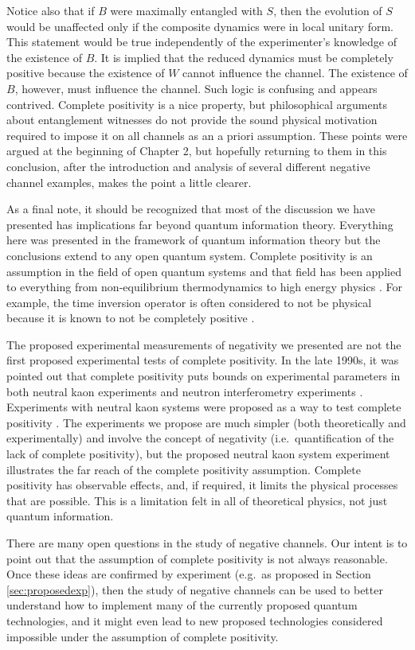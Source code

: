 Notice also that if $B$ were maximally entangled with $S$, then the evolution of $S$ would be unaffected only if the composite dynamics were in local unitary form.  This statement would be true independently of the experimenter's knowledge of the existence of $B$.  It is implied that the reduced dynamics must be completely positive because the existence of $W$ cannot influence the channel.  The existence of $B$, however, must influence the channel.  Such logic is confusing and appears contrived.  Complete positivity is a nice property, but philosophical arguments about entanglement witnesses do not provide the sound physical motivation required to impose it on all channels as an a priori assumption.  These points were argued at the beginning of Chapter 2, but hopefully returning to them in this conclusion, after the introduction and analysis of several different negative channel examples, makes the point a little clearer. 

As a final note, it should be recognized that most of the discussion we have presented has implications far beyond quantum information theory.  Everything here was presented in the framework of quantum information theory but the conclusions extend to any open quantum system.  Complete positivity is an assumption in the field of open quantum systems and that field has been applied to everything from non-equilibrium thermodynamics to high energy physics \cite{Breuer2007}.  For example, the time inversion operator is often considered to not be physical because it is known to not be completely positive \cite{Busch1990}.    

The proposed experimental measurements of negativity we presented are not the first proposed experimental tests of complete positivity.  In the late 1990s, it was pointed out that complete positivity puts bounds on experimental parameters in both neutral kaon experiments \cite{Benatti1996} \cite{Benatti1997} \cite{Benatti1998} and neutron interferometry experiments \cite{Benatti1999}.  Experiments with neutral kaon systems were proposed as a way to test complete positivity \cite{Benatti1997a}.  The experiments we propose are much simpler (both theoretically and experimentally) and involve the concept of negativity (i.e.\ quantification of the lack of complete positivity), but the proposed neutral kaon system experiment illustrates the far reach of the complete positivity assumption.  Complete positivity has observable effects, and, if required, it limits the physical processes that are possible.  This is a limitation felt in all of theoretical physics, not just quantum information.   

There are many open questions in the study of negative channels.  Our intent is to point out that the assumption of complete positivity is not always reasonable.  Once these ideas are confirmed by experiment (e.g.\ as proposed in Section \ref{sec:proposedexp}), then the study of negative channels can be used to better understand how to implement many of the currently proposed quantum technologies, and it might even lead to new proposed technologies considered impossible under the assumption of complete positivity.

